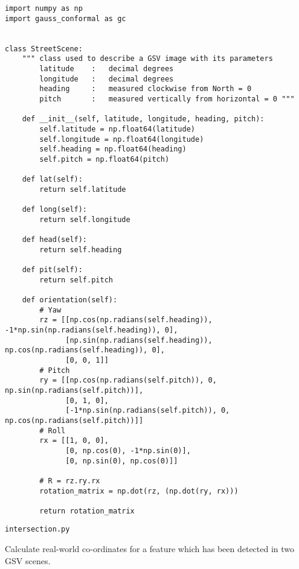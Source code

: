 \begin{lstlisting}
import numpy as np
import gauss_conformal as gc


class StreetScene:
    """ class used to describe a GSV image with its parameters
        latitude    :   decimal degrees
        longitude   :   decimal degrees
        heading     :   measured clockwise from North = 0
        pitch       :   measured vertically from horizontal = 0 """

    def __init__(self, latitude, longitude, heading, pitch):
        self.latitude = np.float64(latitude)
        self.longitude = np.float64(longitude)
        self.heading = np.float64(heading)
        self.pitch = np.float64(pitch)

    def lat(self):
        return self.latitude

    def long(self):
        return self.longitude

    def head(self):
        return self.heading

    def pit(self):
        return self.pitch

    def orientation(self):
        # Yaw
        rz = [[np.cos(np.radians(self.heading)), -1*np.sin(np.radians(self.heading)), 0],
              [np.sin(np.radians(self.heading)), np.cos(np.radians(self.heading)), 0],
              [0, 0, 1]]
        # Pitch
        ry = [[np.cos(np.radians(self.pitch)), 0, np.sin(np.radians(self.pitch))],
              [0, 1, 0],
              [-1*np.sin(np.radians(self.pitch)), 0, np.cos(np.radians(self.pitch))]]
        # Roll
        rx = [[1, 0, 0],
              [0, np.cos(0), -1*np.sin(0)],
              [0, np.sin(0), np.cos(0)]]

        # R = rz.ry.rx
        rotation_matrix = np.dot(rz, (np.dot(ry, rx)))
        
        return rotation_matrix
\end{lstlisting}

\verb|intersection.py|

Calculate real-world co-ordinates for a feature which has been detected in two GSV scenes.


